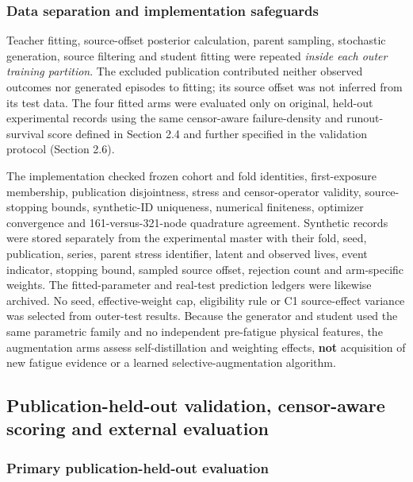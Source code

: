 \documentclass[12pt,a4paper]{article}
\begin{document}
\subsubsection{Data separation and implementation safeguards}

Teacher fitting, source-offset posterior calculation, parent sampling, stochastic generation, source filtering and student fitting were repeated \emph{inside each outer training partition}. The excluded publication contributed neither observed outcomes nor generated episodes to fitting; its source offset was not inferred from its test data. The four fitted arms were evaluated only on original, held-out experimental records using the same censor-aware failure-density and runout-survival score defined in Section 2.4 and further specified in the validation protocol (Section 2.6).

The implementation checked frozen cohort and fold identities, first-exposure membership, publication disjointness, stress and censor-operator validity, source-stopping bounds, synthetic-ID uniqueness, numerical finiteness, optimizer convergence and 161-versus-321-node quadrature agreement. Synthetic records were stored separately from the experimental master with their fold, seed, publication, series, parent stress identifier, latent and observed lives, event indicator, stopping bound, sampled source offset, rejection count and arm-specific weights. The fitted-parameter and real-test prediction ledgers were likewise archived. No seed, effective-weight cap, eligibility rule or C1 source-effect variance was selected from outer-test results. Because the generator and student used the same parametric family and no independent pre-fatigue physical features, the augmentation arms assess self-distillation and weighting effects, \textbf{not} acquisition of new fatigue evidence or a learned selective-augmentation algorithm.

\subsection{Publication-held-out validation, censor-aware scoring and external evaluation}

\subsubsection{Primary publication-held-out evaluation}
\end{document}
